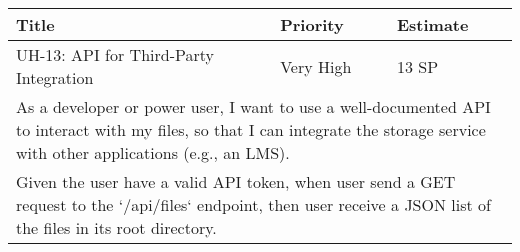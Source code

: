 \vspace{5mm}
\begin{tabular}{|p{4cm}|p{5cm}|p{5cm}|}
    \hline
    \textbf{Title} & \textbf{Priority} & \textbf{Estimate} \\
    \hline
    UH-13: API for Third-Party Integration & Very High & 13 SP \\
    \hline
    \multicolumn{3}{|p{14cm}|}{As a developer or power user, I want to use a well-documented API to interact with my files, so that I can integrate the storage service with other applications (e.g., an LMS).} \\
    \hline
    \multicolumn{3}{|p{14cm}|}{Given the user have a valid API token, when user send a GET request to the `/api/files` endpoint, then user receive a JSON list of the files in its root directory.} \\
    \hline
\end{tabular}
